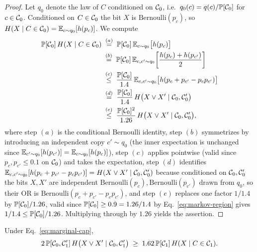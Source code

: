 \begin{proof}
Let $q_0$ denote the law of $C$ conditioned on $\mathcal{C}_0$, i.e.\ $q_0(c) = q(c)/\mathbb{P}[\mathcal{C}_0]$
for $c \in \mathcal{C}_0$. Conditioned on $C \in \mathcal{C}_0$ the bit $X$ is $\mathrm{Bernoulli}(p_c)$,
so $H(X \mid C \in \mathcal{C}_0) = \mathbb{E}_{c \sim q_0}[h(p_c)]$. We compute
\begin{align*}
\mathbb{P}[\mathcal{C}_0]\,H(X \mid C \in \mathcal{C}_0)
&\;\overset{(a)}{=}\; \mathbb{P}[\mathcal{C}_0]\,\mathbb{E}_{c \sim q_0}\bigl[h(p_c)\bigr] \\
&\;\overset{(b)}{=}\; \mathbb{P}[\mathcal{C}_0]\,\mathbb{E}_{c, c' \sim q_0}\!\left[\frac{h(p_c) + h(p_{c'})}{2}\right] \\
&\;\overset{(c)}{\le}\; \frac{\mathbb{P}[\mathcal{C}_0]}{1.4}\,\mathbb{E}_{c, c' \sim q_0}\bigl[h(p_c + p_{c'} - p_c p_{c'})\bigr] \\
&\;\overset{(d)}{=}\; \frac{\mathbb{P}[\mathcal{C}_0]}{1.4}\,H\bigl(X \vee X' \mid \mathcal{C}_0, \mathcal{C}_0'\bigr) \\
&\;\overset{(e)}{\le}\; \frac{\mathbb{P}[\mathcal{C}_0]^2}{1.26}\,H\bigl(X \vee X' \mid \mathcal{C}_0, \mathcal{C}_0'\bigr),
\end{align*}
where step $(a)$ is the conditional Bernoulli identity, step $(b)$ symmetrizes by
introducing an independent copy $c' \sim q_0$ (the inner expectation is unchanged
since $\mathbb{E}_{c'\sim q_0}[h(p_{c'})] = \mathbb{E}_{c\sim q_0}[h(p_c)]$), step $(c)$
applies  pointwise (valid since $p_c, p_{c'} \le 0.1$ on
$\mathcal{C}_0$) and takes the expectation, step $(d)$ identifies
$\mathbb{E}_{c, c' \sim q_0}[h(p_c + p_{c'} - p_c p_{c'})] = H(X \vee X' \mid \mathcal{C}_0, \mathcal{C}_0')$
because conditioned on $\mathcal{C}_0, \mathcal{C}_0'$ the bits $X, X'$ are independent
$\mathrm{Bernoulli}(p_c), \mathrm{Bernoulli}(p_{c'})$ drawn from $q_0$, so their
OR is $\mathrm{Bernoulli}(p_c + p_{c'} - p_c p_{c'})$, and step $(e)$ replaces one
factor $1/1.4$ by $\mathbb{P}[\mathcal{C}_0]/1.26$, valid since $\mathbb{P}[\mathcal{C}_0] \ge 0.9 = 1.26/1.4$ by
Eq.~\eqref{eq:markov-region} gives $1/1.4 \le \mathbb{P}[\mathcal{C}_0]/1.26$. Multiplying through
by $1.26$ yields the assertion.
\end{proof}

\begin{lemma}
\label{lem:region-mix}
Under Eq.~\eqref{eq:marginal-cap},
\begin{align*}
2\,\mathbb{P}[\mathcal{C}_0, \mathcal{C}_1']\, H\bigl(X \vee X' \mid \mathcal{C}_0, \mathcal{C}_1'\bigr)
\;\ge\; 1.62\,\mathbb{P}[\mathcal{C}_1]\, H(X \mid C \in \mathcal{C}_1).
\end{align*}
\end{lemma}

